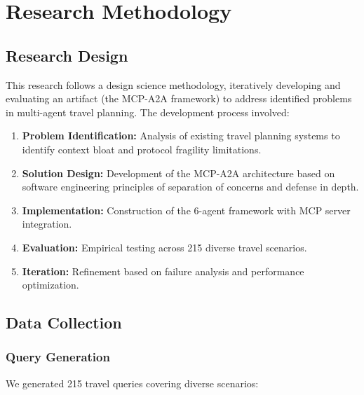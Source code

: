\documentclass[preprint,review,12pt]{elsarticle}
\begin{document}
\section{Research Methodology}
\label{sec:methodology}

\subsection{Research Design}

This research follows a design science methodology, iteratively developing and evaluating an artifact (the MCP-A2A framework) to address identified problems in multi-agent travel planning. The development process involved:

\begin{enumerate}
    \item \textbf{Problem Identification:} Analysis of existing travel planning systems to identify context bloat and protocol fragility limitations.
    \item \textbf{Solution Design:} Development of the MCP-A2A architecture based on software engineering principles of separation of concerns and defense in depth.
    \item \textbf{Implementation:} Construction of the 6-agent framework with MCP server integration.
    \item \textbf{Evaluation:} Empirical testing across 215 diverse travel scenarios.
    \item \textbf{Iteration:} Refinement based on failure analysis and performance optimization.
\end{enumerate}

\subsection{Data Collection}

\subsubsection{Query Generation}

We generated 215 travel queries covering diverse scenarios:
\end{document}
